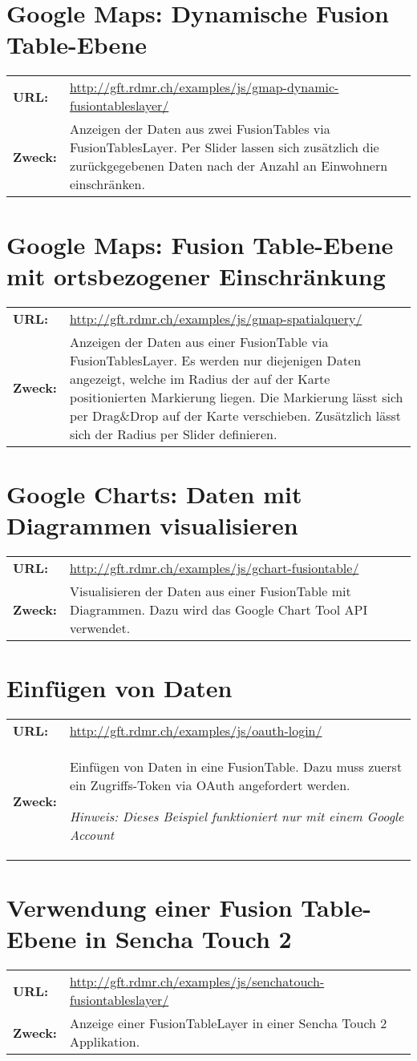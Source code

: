 \section{Google Maps: Dynamische Fusion Table-Ebene}
\begin{tabular}{lp{12cm}}
\textbf{URL:} & \url{http://gft.rdmr.ch/examples/js/gmap-dynamic-fusiontableslayer/} \\ 
\textbf{Zweck:} & Anzeigen der Daten aus zwei FusionTables via FusionTablesLayer. Per Slider lassen sich zusätzlich die zurückgegebenen Daten nach der Anzahl an Einwohnern einschränken.  \\ 
\end{tabular} 

\section{Google Maps: Fusion Table-Ebene mit ortsbezogener Einschränkung}
\begin{tabular}{lp{12cm}}
\textbf{URL:} & \url{http://gft.rdmr.ch/examples/js/gmap-spatialquery/} \\ 
\textbf{Zweck:} & Anzeigen der Daten aus einer FusionTable via FusionTablesLayer. Es werden nur diejenigen Daten angezeigt, welche im Radius der auf der Karte positionierten Markierung liegen. Die Markierung lässt sich per Drag{\&}Drop auf der Karte verschieben. Zusätzlich lässt sich der Radius per Slider definieren. \\ 
\end{tabular} 

\section{Google Charts: Daten mit Diagrammen visualisieren}
\begin{tabular}{lp{12cm}}
\textbf{URL:} & \url{http://gft.rdmr.ch/examples/js/gchart-fusiontable/} \\ 
\textbf{Zweck:} & Visualisieren der Daten aus einer FusionTable mit Diagrammen. Dazu wird das Google Chart Tool API verwendet. \\ 
\end{tabular} 

\section{Einfügen von Daten}
\begin{tabular}{lp{12cm}}
\textbf{URL:} & \url{http://gft.rdmr.ch/examples/js/oauth-login/} \\ 
\textbf{Zweck:} & Einfügen von Daten in eine FusionTable. Dazu muss zuerst ein Zugriffs-Token via OAuth angefordert werden.

\textit{Hinweis: Dieses Beispiel funktioniert nur mit einem Google Account} \\ 
\end{tabular} 

\section{Verwendung einer Fusion Table-Ebene in Sencha Touch 2}
\begin{tabular}{lp{12cm}}
\textbf{URL:} & \url{http://gft.rdmr.ch/examples/js/senchatouch-fusiontableslayer/} \\ 
\textbf{Zweck:} & Anzeige einer FusionTableLayer in einer Sencha Touch 2 Applikation. \\ 
\end{tabular} 